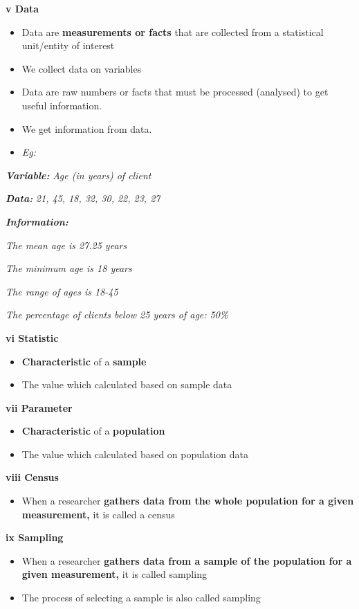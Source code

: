 \documentclass[]{book}
\providecommand{\tightlist}{%
  \setlength{\itemsep}{0pt}\setlength{\parskip}{0pt}}
\begin{document}
\textbf{v Data}

\begin{itemize}
\item
  Data are \textbf{measurements or facts} that are collected from a statistical unit/entity of interest
\item
  We collect data on variables
\item
  Data are raw numbers or facts that must be processed (analysed) to get useful information.
\item
  We get information from data.
\item
  \emph{Eg:}
\end{itemize}

\textbf{\emph{Variable:}} \emph{Age (in years) of client}

\textbf{\emph{Data:}} \emph{21, 45, 18, 32, 30, 22, 23, 27}

\textbf{\emph{Information:}}

\emph{The mean age is 27.25 years}

\emph{The minimum age is 18 years}

\emph{The range of ages is 18-45}

\emph{The percentage of clients below 25 years of age: 50\%}

\textbf{vi Statistic}

\begin{itemize}
\tightlist
\item
  \textbf{Characteristic} of a \textbf{sample}
\item
  The value which calculated based on sample data
\end{itemize}

\textbf{vii Parameter}

\begin{itemize}
\tightlist
\item
  \textbf{Characteristic} of a \textbf{population}
\item
  The value which calculated based on population data
\end{itemize}

\textbf{viii Census}

\begin{itemize}
\tightlist
\item
  When a researcher \textbf{gathers data from the whole population for a given measurement,} it is called a census
\end{itemize}

\textbf{ix Sampling}

\begin{itemize}
\tightlist
\item
  When a researcher \textbf{gathers data from a sample of the population for a given measurement,} it is called sampling
\item
  The process of selecting a sample is also called sampling
\end{itemize}
\end{document}
